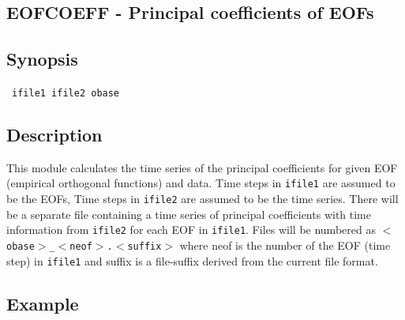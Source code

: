 \newpage
\subsection{EOFCOEFF - Principal coefficients of EOFs}
\label{EOFCOEFF}
\label{eofcoeff}

\subsection*{Synopsis}

\hspace*{8mm}{\bf eofcoeff}{\sl } \ {\tt ifile1 ifile2 obase}


\subsection*{Description}

\setlength{\miniwidth}{\textwidth}
\addtolength{\miniwidth}{-8mm}
\hspace*{8mm}\begin{minipage}{\miniwidth}
This module calculates the time series of the principal coefficients for given EOF
(empirical orthogonal functions) and data. Time steps in {\tt ifile1} are 
assumed to be the EOFs, Time steps in {\tt ifile2} are assumed to be the
time series. 
There will be a separate file containing a time series of principal coefficients
with time information from {\tt ifile2} for each EOF in {\tt ifile1}. Files
will be numbered as {\tt $<$obase$>$\_$<$neof$>$.$<$suffix$>$} where neof is the number of the
EOF (time step) in {\tt ifile1} and suffix is a file-suffix derived from the 
current file format. 
\end{minipage}
\addtolength{\miniwidth}{8mm}
\setlength{\miniwidth}{\textwidth}
\addtolength{\miniwidth}{-8mm}
\hspace*{8mm}\begin{minipage}{\miniwidth}
\end{minipage}
\addtolength{\miniwidth}{8mm}

\subsection*{Example}

